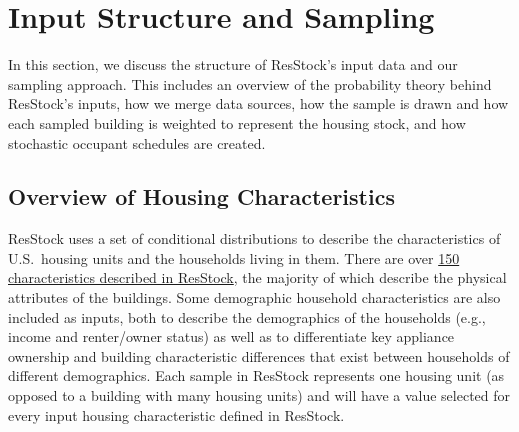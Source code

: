 \chapter{Input Structure and Sampling} \label{sec:input_structure_and_sampling}
In this section, we discuss the structure of ResStock's input data and our sampling approach. This includes an overview of the probability theory behind ResStock's inputs, how we merge data sources, how the sample is drawn and how each sampled building is weighted to represent the housing stock, and how stochastic occupant schedules are created.


\section{Overview of Housing Characteristics} \label{hc_overview}
ResStock uses a set of conditional distributions to describe the characteristics of U.S.~housing units and the households living in them. There are over \href{https://github.com/NREL/resstock/tree/2025_Release_1/project_national/housing_characteristics}{150 characteristics described in ResStock}, the majority of which describe the physical attributes of the buildings. Some demographic household characteristics are also included as inputs, both to describe the demographics of the households (e.g., income and renter/owner status) as well as to differentiate key appliance ownership and building characteristic differences that exist between households of different demographics. Each sample in ResStock represents one housing unit (as opposed to a building with many housing units) and will have a value selected for every input housing characteristic defined in ResStock.

